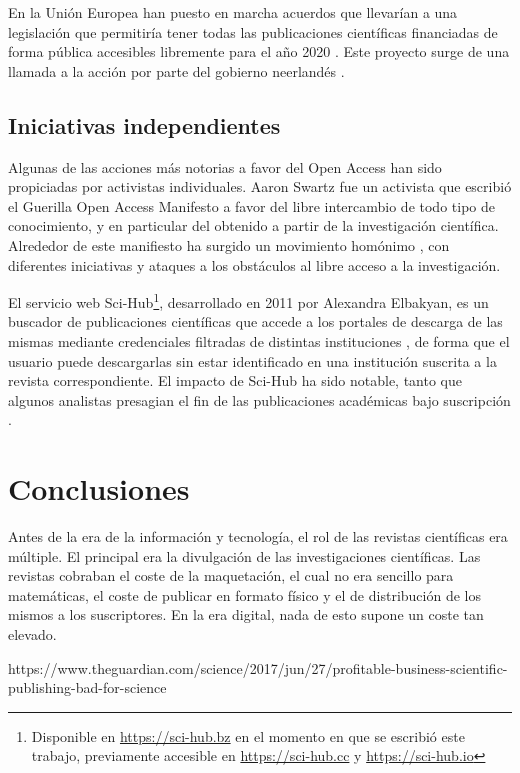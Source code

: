 En la Unión Europea han puesto en marcha acuerdos que llevarían a una legislación que permitiría tener todas las publicaciones científicas financiadas de forma pública accesibles libremente para el año 2020 \cite{enserink2016dramatic}. Este proyecto surge de una llamada a la acción por parte del gobierno neerlandés \cite{amsterdam}.

\subsection{Iniciativas independientes}

Algunas de las acciones más notorias a favor del Open Access han sido propiciadas por activistas individuales. Aaron Swartz fue un activista que escribió el Guerilla Open Access Manifesto \cite{goam} a favor del libre intercambio de todo tipo de conocimiento, y en particular del obtenido a partir de la investigación científica. Alrededor de este manifiesto ha surgido un movimiento homónimo \cite{pirates}, con diferentes iniciativas y ataques a los obstáculos al libre acceso a la investigación.

El servicio web Sci-Hub\footnote{Disponible en \url{https://sci-hub.bz} en el momento en que se escribió este trabajo, previamente accesible en \url{https://sci-hub.cc} y \url{https://sci-hub.io}}, desarrollado en 2011 por Alexandra Elbakyan, es un buscador de publicaciones científicas que accede a los portales de descarga de las mismas mediante credenciales filtradas de distintas instituciones \cite{himmelstein-scihub}, de forma que el usuario puede descargarlas sin estar identificado en una institución suscrita a la revista correspondiente. El impacto de Sci-Hub ha sido notable, tanto que algunos analistas presagian el fin de las publicaciones académicas bajo suscripción \cite{sciencescihub}.





\section{Conclusiones} %

Antes de la era de la información y tecnología, el rol de las revistas científicas era múltiple. El principal era la divulgación de las investigaciones científicas. Las revistas cobraban el coste de la maquetación, el cual no era sencillo para matemáticas, el coste de publicar en formato físico y el de distribución de los mismos a los suscriptores. En la era digital, nada de esto supone un coste tan elevado.

https://www.theguardian.com/science/2017/jun/27/profitable-business-scientific-publishing-bad-for-science
